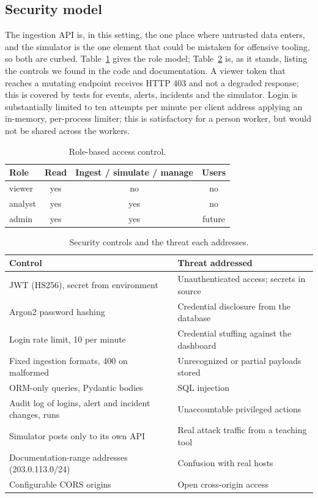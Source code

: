 \documentclass[conference]{IEEEtran}
\begin{document}
\subsection{Security model}
The ingestion API is, in this setting, the one place where untrusted data enters, and the simulator is the one element that could be mistaken for offensive tooling, so both are curbed. Table~\ref{tab:rbac} gives the role model; Table~\ref{tab:controls} is, as it stands, listing the controls we found in the code and documentation. A viewer token that reaches a mutating endpoint receives HTTP 403 and not a degraded response; this is covered by tests for events, alerts, incidents and the simulator. Login is substantially limited to ten attempts per minute per client address applying an in-memory, per-process limiter; this is satisfactory for a person worker, but would not be shared across the workers.

\begin{table}[t]
\caption{Role-based access control.}
\label{tab:rbac}
\centering
\footnotesize
\begin{tabular}{@{}l c c c@{}}
\toprule
Role & Read & Ingest / simulate / manage & Users \\
\midrule
viewer  & yes & no  & no \\
analyst & yes & yes & no \\
admin   & yes & yes & future \\
\bottomrule
\end{tabular}
\end{table}

\begin{table}[t]
\caption{Security controls and the threat each addresses.}
\label{tab:controls}
\centering
\footnotesize
\begin{tabular}{@{}p{4.3cm} p{3.6cm}@{}}
\toprule
Control & Threat addressed \\
\midrule
JWT (HS256), secret from environment & Unauthenticated access; secrets in source \\
Argon2 password hashing & Credential disclosure from the database \\
Login rate limit, 10 per minute & Credential stuffing against the dashboard \\
Fixed ingestion formats, 400 on malformed & Unrecognized or partial payloads stored \\
ORM-only queries, Pydantic bodies & SQL injection \\
Audit log of logins, alert and incident changes, runs & Unaccountable privileged actions \\
Simulator posts only to its own API & Real attack traffic from a teaching tool \\
Documentation-range addresses (203.0.113.0/24) & Confusion with real hosts \\
Configurable CORS origins & Open cross-origin access \\
\bottomrule
\end{tabular}
\end{table}
\end{document}
